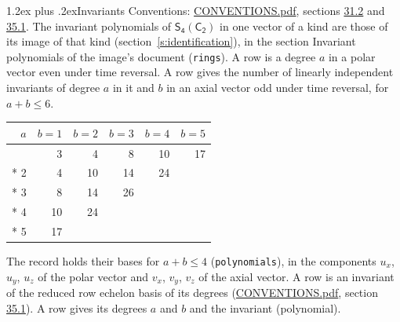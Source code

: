 \documentclass[10pt,a4paper]{article}
\makeatletter
\renewcommand\section{\@startsection{section}{1}{\z@}{-3ex plus -1ex minus -.2ex}%
  {1.2ex plus .2ex}{\normalfont\large\sffamily\bfseries\color{parttitle}}}
\numberwithin{equation}{section}
\newcommand{\grp}[1]{\mathsf{#1}}
\makeatother
\begin{document}
\section{Invariants}\label{s:invariants}
Conventions: \href{../../CONVENTIONS.pdf}{CONVENTIONS.pdf}, sections \href{../../CONVENTIONS.pdf\#conv.31.2}{31.2} and \href{../../CONVENTIONS.pdf\#conv.35.1}{35.1}.
The invariant polynomials of $\grp{S_{4}}(\grp{C_{2}})$ in one vector of a kind are those of its image of that kind (section~\ref{s:identification}), in the section Invariant polynomials of the image's document (\texttt{rings}).
\leavevmode\label{n:index.degree.polar}\label{n:index.degree.axial}A row is a degree $a$ in a polar vector even under time reversal. A row gives the number of linearly independent invariants of degree $a$ in it and $b$ in an axial vector odd under time reversal, for $a + b \le 6$.
{\small\begin{longtable}{@{}rrrrrr@{}}\toprule
$a$ & $b = 1$ & $b = 2$ & $b = 3$ & $b = 4$ & $b = 5$\\\midrule\endhead
\bottomrule\endfoot\endlastfoot
1 & 3 & 4 & 8 & 10 & 17\\*
2 & 4 & 10 & 14 & 24 & \\*
3 & 8 & 14 & 26 &  & \\*
4 & 10 & 24 &  &  & \\*
5 & 17 &  &  &  & \\
\bottomrule\end{longtable}}
\leavevmode\label{n:local.component.polar}\label{n:local.component.axial}The record holds their bases for $a + b \le 4$ (\texttt{polynomials}), in the components $u_{x}$, $u_{y}$, $u_{z}$ of the polar vector and $v_{x}$, $v_{y}$, $v_{z}$ of the axial vector. \label{n:head.polynomial}A row is an invariant of the reduced row echelon basis of its degrees (\href{../../CONVENTIONS.pdf}{CONVENTIONS.pdf}, section \href{../../CONVENTIONS.pdf\#conv.35.1}{35.1}). A row gives its degrees $a$ and $b$ and the invariant (polynomial).
\end{document}
